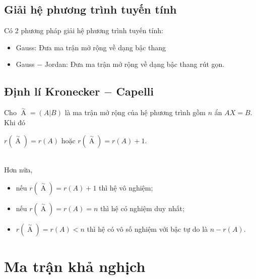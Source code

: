 \subsection{Giải hệ phương trình tuyến tính}
Có 2 phương pháp giải hệ phương trình tuyến tính:
\begin{itemize}
\item Gauss: Đưa ma trận mở rộng về dạng bậc thang
\item Gauss $-$ Jordan: Đưa ma trận mở rộng về dạng bậc thang rút gọn.
\end{itemize}
\subsection{Định lí Kronecker $-$ Capelli}
\begin{mybox}
\begin{theorem}
Cho $\mathop A\limits^ \sim   = \left( {\left. A \right|B} \right)$ là ma trận mở rộng của hệ phương trình gồm $n$ ẩn $AX = B.$ Khi đó\\
\centerline{$r \left( {\mathop A\limits^ \sim} \right) = r \left( A \right)$ hoặc $r \left( {\mathop A\limits^ \sim} \right) = r \left( A \right) + 1.$}\\
Hơn nữa,
\begin{itemize}
\item nếu $r \left( {\mathop A\limits^ \sim} \right) = r \left( A \right) + 1$ thì hệ vô nghiệm;
\item nếu $r \left( {\mathop A\limits^ \sim} \right) = r \left( A \right) = n$ thì hệ có nghiệm duy nhất;
\item $r \left( {\mathop A\limits^ \sim} \right) = r \left( A \right) < n$ thì hệ có vô số nghiệm với bậc tự do là $ n - r \left( A \right).$
\end{itemize}
\end{theorem}
\end{mybox}
\section{Ma trận khả nghịch}
